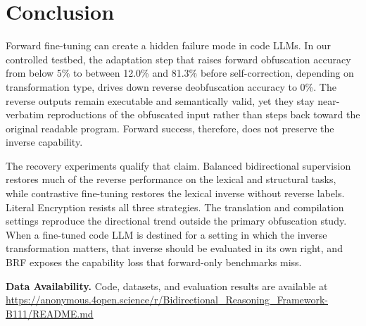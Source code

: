 \section{Conclusion}
\label{sec:conclusion}

Forward fine-tuning can create a hidden failure mode in code LLMs. In our
controlled testbed, the adaptation step that raises forward obfuscation accuracy from below 5\%
to between 12.0\% and 81.3\% before self-correction,  depending on transformation type, drives down reverse deobfuscation accuracy to 0\%. The reverse
outputs remain executable and semantically valid, yet they stay near-verbatim
reproductions of the obfuscated input rather than steps back toward the original
readable program. 
Forward success, therefore, does not preserve the inverse capability.

The recovery experiments qualify that claim. Balanced bidirectional supervision
restores much of the reverse performance on the lexical and structural tasks,
while contrastive fine-tuning restores the lexical inverse without reverse
labels. Literal Encryption resists all three strategies. The translation and
compilation settings reproduce the directional trend outside the primary
obfuscation study. When a fine-tuned code LLM is destined for a setting in which
the inverse transformation matters, that inverse should be evaluated in its own
right, and BRF exposes the capability loss that forward-only benchmarks miss.

\noindent\textbf{Data Availability.} Code, datasets, and evaluation results are available at
\url{https://anonymous.4open.science/r/Bidirectional_Reasoning_Framework-B111/README.md}
